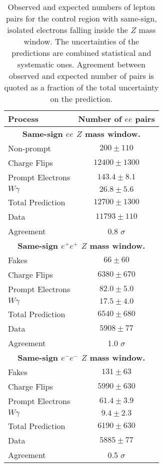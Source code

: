 \begin{table}[htbp]
\begin{center}
\begin{tabular}{l|c}
\hline
Process & Number of $ee$ pairs \\\hline\hline
%
\multicolumn{2}{c}{\textbf{Same-sign $ee$ $Z$ mass window.}} \\\hline 
        Non-prompt      & $200 \pm 110$ \\[+0.05in]
        Charge Flips & $12400 \pm 1300$ \\[+0.05in]
        Prompt Electrons & $143.4 \pm 8.1$ \\[+0.05in]
        $W\gamma$  & $26.8 \pm 5.6$ \\[+0.05in]
            \hline
        Total Prediction & $12700 \pm 1300$ \\[+0.05in]
            \hline
        Data       &       $11793 \pm 110$ \\[+0.05in]
            \hline
        Agreement  &      0.8 $\sigma$ \\[+0.05in]
\hline \hline
\multicolumn{2}{c}{\textbf{Same-sign $e^{+}e^{+}$ $Z$ mass window.}} \\\hline 
        Fakes      & $66 \pm 60$ \\[+0.05in]
        Charge Flips & $6380 \pm 670$ \\[+0.05in]
        Prompt Electrons & $82.0 \pm 5.0$ \\[+0.05in]
        $W\gamma$  & $17.5 \pm 4.0$ \\[+0.05in]
            \hline
        Total Prediction & $6540 \pm 680$ \\[+0.05in]
            \hline
        Data       &        $5908 \pm 77$ \\[+0.05in]
            \hline
        Agreement  &     1.0 $\sigma$ \\[+0.05in]
%
\hline \hline
\multicolumn{2}{c}{\textbf{Same-sign $e^{-}e^{-}$ $Z$ mass window.}} \\\hline 
        Fakes      & $131 \pm 63$ \\[+0.05in]
        Charge Flips & $5990 \pm 630$ \\[+0.05in]
        Prompt Electrons & $61.4 \pm 3.9$ \\[+0.05in]
        $W\gamma$  & $9.4 \pm 2.3$ \\[+0.05in]
            \hline
        Total Prediction & $6190 \pm 630$ \\[+0.05in]
            \hline
        Data       &        $5885 \pm 77$ \\[+0.05in]
            \hline
        Agreement  &     0.5 $\sigma$ \\[+0.05in]
\hline 
\end{tabular}
\end{center}
\caption{Observed and expected numbers of lepton pairs for the control region with same-sign, isolated electrons falling inside the $Z$ mass window. 
The uncertainties of the predictions are combined statistical and systematic ones.
Agreement between observed and expected number of pairs is quoted as a fraction of the total uncertainty on the prediction.
}
\label{tab:ee_isoSS_Z}
\end{table}


